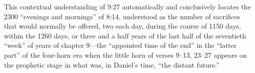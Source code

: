 This contextual understanding of 9:27 automatically and conclusively locates
the 2300 ``evenings and mornings'' of 8:14, understood as the number of
sacrifices that would normally be offered, two each day, during the course
of 1150 days, within the 1260 days, or three and a half years of the last
half of the seventieth ``week'' of years of chapter 9---the ``appointed time of
the end'' in the ``latter part'' of the four-horn 
era when the little horn
of verses 9--13, 23--27 appears on the prophetic stage in what was, in
Daniel's time, ``the distant future.''

